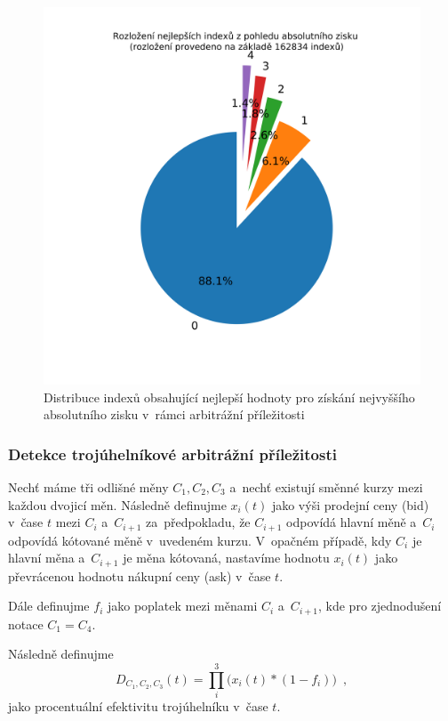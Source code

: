 \documentclass[thesis=B,czech]{FITthesis}[2019/03/21]
\begin{document}
\begin{figure}\centering
	\includegraphics[width=1\textwidth]{images/index_distribution.png}
	\caption{Distribuce indexů obsahující nejlepší hodnoty pro získání nejvyššího absolutního zisku v~rámci arbitrážní příležitosti}\label{index_distribution}
\end{figure}
\subsubsection{Detekce trojúhelníkové arbitrážní příležitosti}
Nechť máme tři odlišné měny \(C_1,C_2,C_3\) a~nechť existují směnné kurzy mezi každou dvojicí měn. Následně definujme \(x_i(t)\) jako výši prodejní ceny (bid) v~čase \(t\) mezi \(C_i\) a~\(C_{i+1}\) za~předpokladu, že \(C_{i+1}\) odpovídá hlavní měně a~\(C_{i}\) odpovídá kótované měně v~uvedeném kurzu. V~opačném případě, kdy \(C_{i}\) je hlavní měna a~\(C_{i+1}\) je měna kótovaná, nastavíme hodnotu \(x_i(t)\) jako převrácenou hodnotu nákupní ceny (ask) v~čase \(t\).

Dále definujme \(f_i\) jako poplatek mezi měnami \(C_i\) a~\(C_{i+1}\), kde pro zjednodušení notace \(C_1 = C_4\).

Následně definujme
\begin{equation}
\label{arbitrage_equation}
    D_{C_1,C_2,C_3}(t) = \prod_i^3\Big(x_i(t)*(1-f_i)\Big) \enspace ,
\end{equation}
jako procentuální efektivitu trojúhelníku v~čase \(t\).
\end{document}
